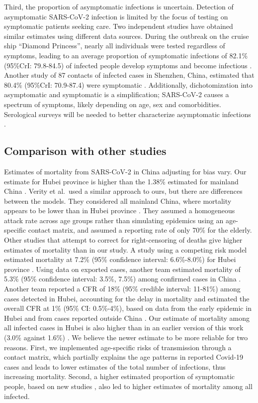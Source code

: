 \documentclass{article}
\begin{document}
Third, the proportion of asymptomatic infections is uncertain. Detection of asymptomatic SARS-CoV-2 infection is limited by the focus of testing on symptomatic patients seeking care. Two independent studies have obtained similar estimates using different data sources. During the outbreak on the cruise ship “Diamond Princess”, nearly all individuals were tested regardless of symptoms, leading to an average proportion of symptomatic infections of 82.1\% (95\%CrI: 79.8-84.5) of infected people develop symptoms and become infectious \cite{mizumoto2020estimating}. Another study of 87 contacts of infected cases in Shenzhen, China, estimated that 80.4\% (95\%CrI: 70.9-87.4) were symptomatic \cite{Bi2020}. Additionally, dichotomization into asymptomatic and symptomatic is a simplification; SARS-CoV-2 causes a spectrum of symptoms, likely depending on age, sex and comorbidities. Serological surveys will be needed to better characterize asymptomatic infections \cite{carrat2008time}.

\subsection*{Comparison with other studies}

Estimates of mortality from SARS-CoV-2 in China adjusting for bias vary. 
Our estimate for Hubei province is higher than the 1.38\% estimated for mainland China \cite{Verity2020}. 
Verity et al. used a similar approach to ours, but there are differences between the models. 
They considered all mainland China, where mortality appears to be lower than in Hubei province \cite{Team2020}. 
They assumed a homogeneous attack rate across age groups rather than simulating epidemics using an age-specific contact matrix, and assumed a reporting rate of only 70\% for the elderly. 
Other studies that attempt to correct for right-censoring of deaths give higher estimates of mortality than in our study. 
A study using a competing risk model estimated mortality at 7.2\% (95\% confidence interval: 6.6\%-8.0\%) for Hubei province \cite{wang2020estimating}. Using data on exported cases, another team estimated mortality of 5.3\% (95\% confidence interval: 3.5\%, 7.5\%) among confirmed cases in China \cite{jung2020real}. 
Another team reported a CFR of 18\% (95\% credible interval: 11-81\%) among cases detected in Hubei, accounting for the delay in mortality and estimated the overall CFR at 1\% (95\% CI: 0.5\%-4\%), based on data from the early epidemic in Hubei and from cases reported outside China \cite{Dorigatti}. 
Our estimate of mortality among all infected cases in Hubei is also higher than in an earlier version of this work (3.0\% against 1.6\%) \cite{riou2020adjusted}. We believe the newer estimate to be more reliable for two reasons. First, we implemented age-specific risks of transmission through a contact matrix, which partially explains the age patterns in reported Covid-19 cases and leads to lower estimates of the total number of infections, thus increasing mortality. Second, a higher estimated proportion of symptomatic people, based on new studies \cite{mizumoto2020estimating,Bi2020}, also led to higher estimates of mortality among all infected.
\end{document}
